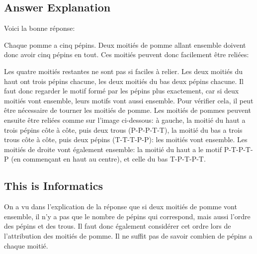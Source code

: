 \documentclass[a4paper,11pt]{report}
\newcommand{\taskGraphicsFolder}{..}
\begin{document}
\endgroup

\subsection*{Answer Explanation}

Voici la bonne réponse:

{\centering%
\par}

Chaque pomme a cinq pépins. Deux moitiés de pomme allant ensemble doivent donc avoir cinq pépins en tout. Ces moitiés peuvent donc facilement être reliées:

{\centering%
\par}

Les quatre moitiés restantes ne sont pas si faciles à relier. Les deux moitiés du haut ont trois pépins chacune, les deux moitiés du bas deux pépins chacune. Il faut donc regarder le motif formé par les pépins plus exactement, car si deux moitiés vont ensemble, leurs motifs vont aussi ensemble. Pour vérifier cela, il peut être nécessaire de tourner les moitiés de pomme. Les moitiés de pommes peuvent ensuite être reliées comme sur l’image ci-dessous: à gauche, la moitié du haut a trois pépins côte à côte, puis deux trous (P-P-P-T-T), la moitié du bas a trois trous côte à côte, puis deux pépins (T-T-T-P-P): les moitiés vont ensemble. Les moitiés de droite vont également ensemble: la moitié du haut a le motif P-T-P-T-P (en commençant en haut au centre), et celle du bas T-P-T-P-T.

{\centering%
\par}


\subsection*{This is Informatics}

On a vu dans l’explication de la réponse que si deux moitiés de pomme vont ensemble, il n’y a pas que le nombre de pépins qui correspond, mais aussi l’ordre des pépins et des trous. Il faut donc également considérer cet ordre lors de l’attribution des moitiés de pomme. Il ne suffit pas de savoir combien de pépins a chaque moitié.
\end{document}

